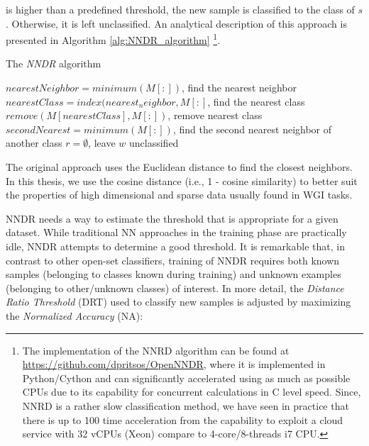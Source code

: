 \nointend is higher than a predefined threshold, the new sample is classified to the class of $s$. Otherwise, it is left unclassified. An analytical description of this approach is presented in Algorithm \ref{alg:NNDR_algorithm} \footnote{The implementation of the NNRD algorithm can be found at \url{https://github.com/dpritsos/OpenNNDR}, where it is implemented in Python/Cython and can significantly accelerated using as much as possible CPUs due to its capability for concurrent calculations in C level speed. Since, NNRD is a rather slow classification method, we have seen in practice that there is up to 100 time acceleration from the capability to exploit a cloud service with 32 vCPUs (Xeon) compare to 4-core/8-threads i7 CPU.}. 

\begin{algorithm}[t]
\caption{The \textit{NNDR} algorithm}
\label{alg:NNDR_algorithm}

$nearestNeighbor = minimum(M[:])$, find the nearest neighbor\;
$nearestClass = index(nearest_neighbor, M[:]$, find the nearest class\;
$remove(M[nearestClass],M[:])$, remove nearest class\;
$secondNearest = minimum(M[:])$, find the second nearest neighbor of another class\;
    {$r = \emptyset$, leave $w$ unclassified\;}

\end{algorithm}

The original approach uses the Euclidean distance to find the closest neighbors. In this thesis, we use the cosine distance (i.e., 1 - cosine similarity) to better suit the properties of high dimensional and sparse data usually found in WGI tasks. 

NNDR needs a way to estimate the threshold that is appropriate for a given dataset. While traditional NN approaches in the training phase are practically idle, NNDR attempts to determine a good threshold. It is remarkable that, in contrast to other open-set classifiers, training of NNDR requires both known samples (belonging to classes known during training) and unknown examples (belonging to other/unknown classes) of interest. In more detail, the \textit{Distance Ratio Threshold} (DRT) used to classify new samples is adjusted by maximizing the \textit{Normalized Accuracy} (NA):

